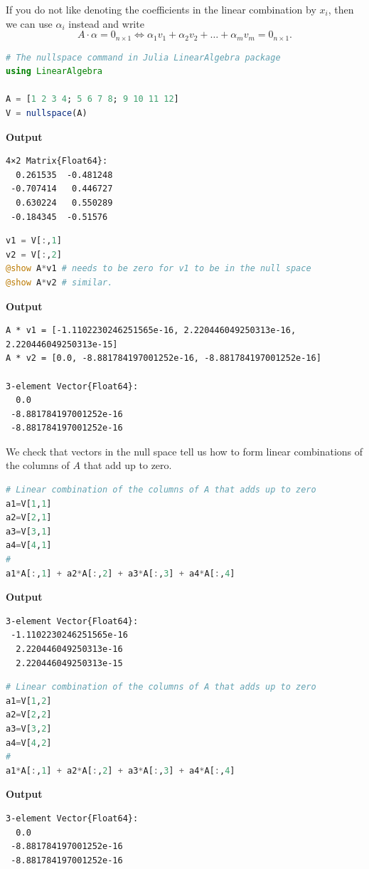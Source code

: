 \begin{rem} If you do not like denoting the coefficients in the linear combination by $x_i$, then we can use $\alpha_i$ instead and write 
$$A \cdot \alpha = 0_{n \times 1} \iff \alpha_1 v_1 + \alpha_2 v_2 + \ldots + \alpha_m v_m = 0_{n \times 1}.$$
\end{rem}

\begin{lstlisting}[language=Julia,style=mystyle]
# The nullspace command in Julia LinearAlgebra package
using LinearAlgebra

A = [1 2 3 4; 5 6 7 8; 9 10 11 12]
V = nullspace(A)
\end{lstlisting}
\textbf{Output} 
\begin{verbatim}
4×2 Matrix{Float64}:
  0.261535  -0.481248
 -0.707414   0.446727
  0.630224   0.550289
 -0.184345  -0.51576
\end{verbatim}

\begin{lstlisting}[language=Julia,style=mystyle]
v1 = V[:,1]
v2 = V[:,2]
@show A*v1 # needs to be zero for v1 to be in the null space
@show A*v2 # similar. 
\end{lstlisting}
\textbf{Output} 
\begin{verbatim}
A * v1 = [-1.1102230246251565e-16, 2.220446049250313e-16, 2.220446049250313e-15]
A * v2 = [0.0, -8.881784197001252e-16, -8.881784197001252e-16]

3-element Vector{Float64}:
  0.0
 -8.881784197001252e-16
 -8.881784197001252e-16
\end{verbatim}

We check that vectors in the null space tell us how to form linear combinations of the columns of $A$ that add up to zero. \\

\begin{lstlisting}[language=Julia,style=mystyle]
# Linear combination of the columns of A that adds up to zero
a1=V[1,1]
a2=V[2,1]
a3=V[3,1]
a4=V[4,1]
#
a1*A[:,1] + a2*A[:,2] + a3*A[:,3] + a4*A[:,4]
\end{lstlisting}
\textbf{Output} 
\begin{verbatim}
3-element Vector{Float64}:
 -1.1102230246251565e-16
  2.220446049250313e-16
  2.220446049250313e-15
\end{verbatim}

\begin{lstlisting}[language=Julia,style=mystyle]
# Linear combination of the columns of A that adds up to zero
a1=V[1,2]
a2=V[2,2]
a3=V[3,2]
a4=V[4,2]
#
a1*A[:,1] + a2*A[:,2] + a3*A[:,3] + a4*A[:,4]
\end{lstlisting}
\textbf{Output} 
\begin{verbatim}
3-element Vector{Float64}:
  0.0
 -8.881784197001252e-16
 -8.881784197001252e-16
\end{verbatim}

